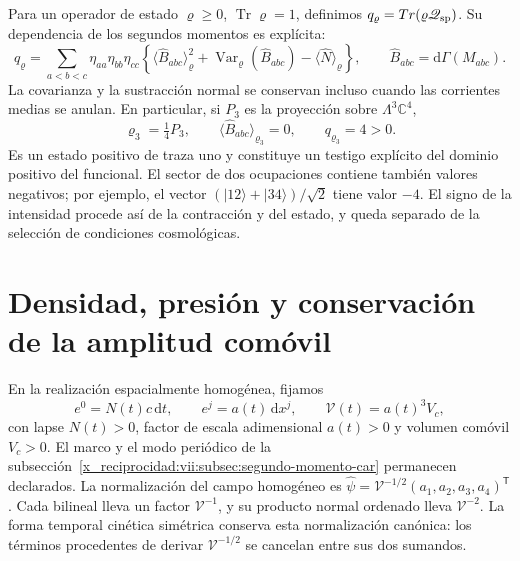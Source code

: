 Para un operador de estado \(\varrho\geq0\),
\(\operatorname{Tr}\varrho=1\), definimos
\(q_\varrho=\operatorname{Tr}(\varrho\widehat{\mathscr Q}_{\rm sp})\).
Su dependencia de los segundos momentos es explícita:
\begin{equation}
 q_\varrho=\sum_{a<b<c}\eta_{aa}\eta_{bb}\eta_{cc}
 \left\{
  \langle\widehat B_{abc}\rangle_\varrho^2
  +\operatorname{Var}_\varrho(\widehat B_{abc})
  -\langle\widehat N\rangle_\varrho
 \right\},\qquad
 \widehat B_{abc}=\mathrm d\Gamma(M_{abc}).
 \label{x_reciprocidad:vii:eq:covarianza-espin-material}
\end{equation}
La covarianza y la sustracción normal se conservan incluso cuando
las corrientes medias se anulan. En particular, si \(P_3\) es la
proyección sobre \(\Lambda^3\mathbb C^4\),
\begin{equation}
 \varrho_3=\tfrac14P_3,\qquad
 \langle\widehat B_{abc}\rangle_{\varrho_3}=0,\qquad
 q_{\varrho_3}=4>0.
 \label{x_reciprocidad:vii:eq:testigo-positivo-espin}
\end{equation}
Es un estado positivo de traza uno y constituye un testigo explícito
del dominio positivo del funcional. El sector de dos ocupaciones
contiene también valores negativos; por ejemplo, el vector
\((|12\rangle+|34\rangle)/\sqrt2\) tiene valor \(-4\).
El signo de la intensidad procede así de la contracción y del
estado, y queda separado de la selección de condiciones cosmológicas.

\section{Densidad, presión y conservación de la amplitud comóvil}
\label{x_reciprocidad:vii:subsec:amplitud-espinorial-comovil}

En la realización espacialmente homogénea, fijamos
\[
 e^0=N(t)c\,\mathrm dt,\qquad e^j=a(t)\,\mathrm dx^j,
 \qquad \mathcal V(t)=a(t)^3V_c,
\]
con lapse \(N(t)>0\), factor de escala adimensional \(a(t)>0\)
y volumen comóvil \(V_c>0\). El marco y el modo periódico de la
subsección~\ref{x_reciprocidad:vii:subsec:segundo-momento-car} permanecen declarados.
La normalización del campo homogéneo es
\(\widehat\psi=\mathcal V^{-1/2}(a_1,a_2,a_3,a_4)^{\mathsf T}\).
Cada bilineal lleva un factor \(\mathcal V^{-1}\), y su producto
normal ordenado lleva \(\mathcal V^{-2}\). La forma temporal
cinética simétrica conserva esta normalización canónica: los términos
procedentes de derivar \(\mathcal V^{-1/2}\) se cancelan entre
sus dos sumandos.

